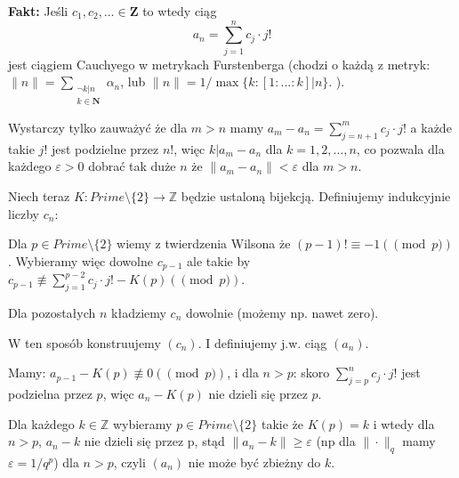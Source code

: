 \documentclass[12pt]{amsart}
\begin{document}
{\bf Fakt:} Jeśli $c_1, c_2,\ldots \in \mathbf{Z}$
to wtedy ciąg 
\[
  a_n = \sum_{j=1}^n c_j \cdot j!
\]
jest ciągiem Cauchyego w metrykach Furstenberga (chodzi o każdą z metryk: 
$\|n\| = \sum_{\substack{\neg k | n\\ k \in \mathbf{N}}} \alpha_n$, lub 
$\|n\| = 1/\max\{k: [1:\ldots:k] | n\}$.
).

Wystarczy tylko zauważyć że dla $m > n$ mamy
$a_m - a_n = \sum_{j=n+1}^m c_j \cdot j!$ a każde takie $j!$ jest 
podzielne przez $n!$, więc $k | a_m - a_n$ dla $k=1,2,\ldots,n$, 
co pozwala dla każdego $\varepsilon > 0$ dobrać tak duże $n$
że $\|a_m - a_n\| < \varepsilon$ dla $m > n$.


Niech teraz $K \colon \mathit{Prime}\setminus \{2\} \to \mathbb{Z}$ będzie
ustaloną bijekcją. Definiujemy indukcyjnie liczby $c_n$:

Dla $p \in \mathit{Prime}\setminus \{2\}$
wiemy z twierdzenia Wilsona że $(p-1)! \equiv -1(\pmod p)$.
Wybieramy więc dowolne $c_{p-1}$ ale takie by
$c_{p-1} \not\equiv \sum_{j=1}^{p-2} c_j \cdot j! - K(p) (\pmod p)$.

Dla pozostałych $n$ kładziemy $c_n$ dowolnie (możemy np. nawet zero).

W ten sposób konstruujemy $(c_n)$. I definiujemy j.w. ciąg $(a_n)$.

Mamy:
$a_{p-1} - K(p) \not\equiv 0 (\pmod p)$, 
i dla $n > p$: skoro $\sum_{j=p}^{n} c_j\cdot j!$ jest podzielna przez $p$,
więc $a_n - K(p)$ nie dzieli się przez $p$. 

Dla każdego $k\in\mathbb{Z}$ wybieramy $p\in\mathit{Prime}\setminus \{2\}$ takie że
$K(p) = k$ i wtedy dla $n > p$, $a_n - k$ nie dzieli się przez p,
stąd $\|a_n - k\| \geq \varepsilon$ (np dla 
$\|\cdot \|_q$ mamy $\varepsilon = 1/q^p$) dla $n > p$, czyli $(a_n)$
nie może być zbieżny do $k$.
\end{document}
